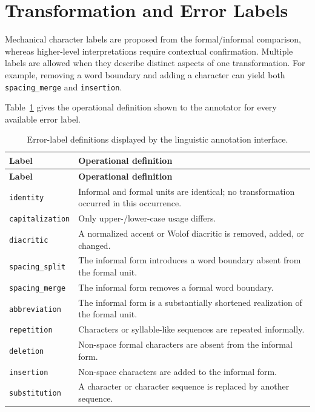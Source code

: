 \documentclass[12pt, a4paper, twoside, openany]{report}
\begin{document}
\section{Transformation and Error Labels}

Mechanical character labels are proposed from the formal/informal comparison, whereas higher-level interpretations require contextual confirmation. Multiple labels are allowed when they describe distinct aspects of one transformation. For example, removing a word boundary and adding a character can yield both \texttt{spacing\_merge} and \texttt{insertion}.

Table~\ref{tab:error-labels} gives the operational definition shown to the annotator for every available error label.

\begin{longtable}{p{3.6cm}p{10.4cm}}
  \caption{Error-label definitions displayed by the linguistic annotation interface.}\label{tab:error-labels}\\
  \toprule
  \textbf{Label} & \textbf{Operational definition} \\
  \midrule
  \endfirsthead
  \toprule
  \textbf{Label} & \textbf{Operational definition} \\
  \midrule
  \endhead
  \texttt{identity} & Informal and formal units are identical; no transformation occurred in this occurrence. \\
  \texttt{capitalization} & Only upper-/lower-case usage differs. \\
  \texttt{diacritic} & A normalized accent or Wolof diacritic is removed, added, or changed. \\
  \texttt{spacing\_split} & The informal form introduces a word boundary absent from the formal unit. \\
  \texttt{spacing\_merge} & The informal form removes a formal word boundary. \\
  \texttt{abbreviation} & The informal form is a substantially shortened realization of the formal unit. \\
  \texttt{repetition} & Characters or syllable-like sequences are repeated informally. \\
  \texttt{deletion} & Non-space formal characters are absent from the informal form. \\
  \texttt{insertion} & Non-space characters are added to the informal form. \\
  \texttt{substitution} & A character or character sequence is replaced by another sequence. \\

\end{longtable}
\end{document}
